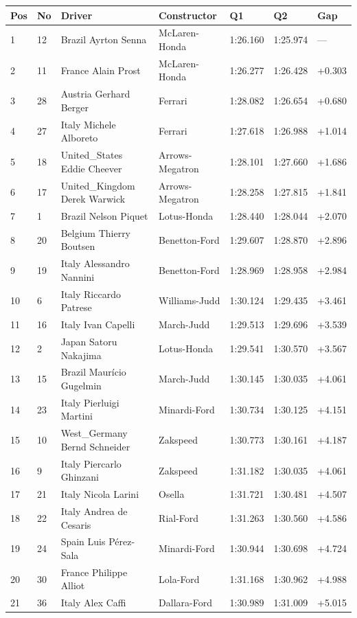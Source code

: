 \documentclass{article}
\begin{document}
\begin{tabular}{lllllll}
\toprule
Pos & No & Driver & Constructor & Q1 & Q2 & Gap \\
\midrule
1 & 12 & Brazil Ayrton Senna & McLaren-Honda & 1:26.160 & 1:25.974 & — \\
2 & 11 & France Alain Prost & McLaren-Honda & 1:26.277 & 1:26.428 & +0.303 \\
3 & 28 & Austria Gerhard Berger & Ferrari & 1:28.082 & 1:26.654 & +0.680 \\
4 & 27 & Italy Michele Alboreto & Ferrari & 1:27.618 & 1:26.988 & +1.014 \\
5 & 18 & United\_States Eddie Cheever & Arrows-Megatron & 1:28.101 & 1:27.660 & +1.686 \\
6 & 17 & United\_Kingdom Derek Warwick & Arrows-Megatron & 1:28.258 & 1:27.815 & +1.841 \\
7 & 1 & Brazil Nelson Piquet & Lotus-Honda & 1:28.440 & 1:28.044 & +2.070 \\
8 & 20 & Belgium Thierry Boutsen & Benetton-Ford & 1:29.607 & 1:28.870 & +2.896 \\
9 & 19 & Italy Alessandro Nannini & Benetton-Ford & 1:28.969 & 1:28.958 & +2.984 \\
10 & 6 & Italy Riccardo Patrese & Williams-Judd & 1:30.124 & 1:29.435 & +3.461 \\
11 & 16 & Italy Ivan Capelli & March-Judd & 1:29.513 & 1:29.696 & +3.539 \\
12 & 2 & Japan Satoru Nakajima & Lotus-Honda & 1:29.541 & 1:30.570 & +3.567 \\
13 & 15 & Brazil Maurício Gugelmin & March-Judd & 1:30.145 & 1:30.035 & +4.061 \\
14 & 23 & Italy Pierluigi Martini & Minardi-Ford & 1:30.734 & 1:30.125 & +4.151 \\
15 & 10 & West\_Germany Bernd Schneider & Zakspeed & 1:30.773 & 1:30.161 & +4.187 \\
16 & 9 & Italy Piercarlo Ghinzani & Zakspeed & 1:31.182 & 1:30.035 & +4.061 \\
17 & 21 & Italy Nicola Larini & Osella & 1:31.721 & 1:30.481 & +4.507 \\
18 & 22 & Italy Andrea de Cesaris & Rial-Ford & 1:31.263 & 1:30.560 & +4.586 \\
19 & 24 & Spain Luis Pérez-Sala & Minardi-Ford & 1:30.944 & 1:30.698 & +4.724 \\
20 & 30 & France Philippe Alliot & Lola-Ford & 1:31.168 & 1:30.962 & +4.988 \\
21 & 36 & Italy Alex Caffi & Dallara-Ford & 1:30.989 & 1:31.009 & +5.015 \\

\end{tabular}
\end{document}
